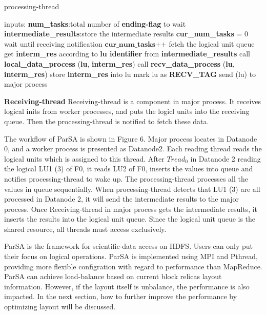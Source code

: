 \documentclass[preprint,12pt]{elsarticle}
\begin{document}
\begin{algorithm}[htb]
\caption{processing-thread} 
\label{alg:processing-thread}
\begin{algorithmic}
\STATE inputs:
\STATE \textbf{num\_tasks}:total number of \textbf{ending-flag} to wait
\STATE \textbf{intermediate\_results}:store the intermediate results
\newline
\STATE \textbf{cur\_num\_tasks} = 0
\STATE wait until receiving notification
\STATE $\textbf{cur\_num\_tasks++}$
\STATE fetch the logical unit queue
\STATE get \textbf{interm\_res} according to \textbf{lu identifier} from \textbf{intermediate\_results}
\STATE call \textbf{local\_data\_process} (\textbf{lu}, \textbf{interm\_res})
\ENDIF
{}
\STATE call \textbf{recv\_data\_process} (\textbf{lu}, \textbf{interm\_res}) 
\ENDIF
{}
\STATE store \textbf{interm\_res} into lu
\STATE mark lu as \textbf{RECV\_TAG}
\STATE send (lu) to major process
\ENDIF
\ENDIF
\ENDFOR
\ENDIF
\ENDWHILE
\end{algorithmic}
\end{algorithm}

\textbf{Receiving-thread} Receiving-thread is a component in major process. It receives logical inits from worker processes, and
puts the logicl units into the receiving queue. Then the processing-thread is notified to fetch these data. \par
The workflow of ParSA is shown in Figure 6. Major process locates in Datanode 0, and a worker process is presented as Datanode2. Each 
reading thread reads the logical units which is assigned to this thread. After $Tread_0$ in Datanode 2 reading the logical LU1 (3) of F0,
it reads LU2 of F0, inserts the values into queue and notifies processing-thread to wake up. The processing-thread processes all the values 
in queue sequentially. When processing-thread detects that LU1 (3) are all processed in Datanode 2, it will send the intermediate results 
to the major process. Once Receiving-thread in major process gets the intermediate results, it inserts the results into the logical unit 
queue. Since the logical unit queue is the shared resource, all threads must access exclusively. \par
ParSA is the framework for scientific-data access on HDFS. Users can only put their focus on logical operations.  ParSA is implemented 
using MPI and Pthread, providing more flexible configration with regard to performance than MapReduce. ParSA can achieve load-balance based
on current block relicas layout information. However, if the layout itself is unbalance, the performance is also impacted. In the next section, how to further improve the performance by optimizing layout will be discussed.
\end{document}
